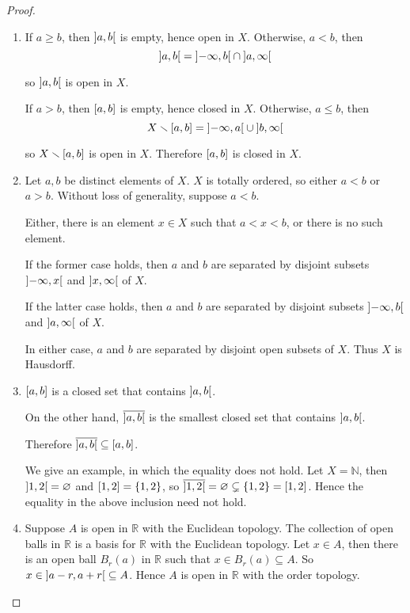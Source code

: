 \begin{proof}
	\begin{enumerate}[label={(\alph*)}]
		\item If $a\geq b$, then $\left]{a,b}\right[$ is empty, hence open in $X$. Otherwise, $a < b$, then
		      \[
			      \left]{a, b}\right[ = \left]{-\infty, b}\right[ \cap \left]{a, \infty}\right[
		      \]

		      so $\left]{a, b}\right[$ is open in $X$.

		      If $a > b$, then $\left[{a,b}\right]$ is empty, hence closed in $X$. Otherwise, $a\leq b$, then
		      \[
			      X\smallsetminus \left[{a, b}\right] = \left]{-\infty, a}\right[\cup\left]{b,\infty}\right[
		      \]

		      so $X\smallsetminus \left[{a,b}\right]$ is open in $X$. Therefore $\left[{a,b}\right]$ is closed in $X$.
		\item Let $a, b$ be distinct elements of $X$. $X$ is totally ordered, so either $a < b$ or $a > b$. Without loss of generality, suppose $a < b$.

		      Either, there is an element $x\in X$ such that $a < x < b$, or there is no such element.

		      If the former case holds, then $a$ and $b$ are separated by disjoint subsets $\left]{-\infty, x}\right[$ and $\left]{x, \infty}\right[$ of $X$.

		      If the latter case holds, then $a$ and $b$ are separated by disjoint subsets $\left]{-\infty, b}\right[$ and $\left]{a, \infty}\right[$ of $X$.

		      In either case, $a$ and $b$ are separated by disjoint open subsets of $X$. Thus $X$ is Hausdorff.
		\item $\left[{a,b}\right]$ is a closed set that contains $\left]{a, b}\right[$.

		      On the other hand, $\overline{\left]{a,b}\right[}$ is the smallest closed set that contains $\left]{a, b}\right[$.

		      Therefore $\overline{\left]{a,b}\right[}\subseteq \left[{a, b}\right]$.

		      We give an example, in which the equality does not hold. Let $X = \mathbb{N}$, then $\left]{1,2}\right[ = \varnothing$ and $\left[{1,2}\right] = \{ 1, 2 \}$, so $\overline{\left]{1,2}\right[} = \varnothing \subsetneq \{ 1, 2 \} = \left[{1,2}\right]$. Hence the equality in the above inclusion need not hold.
		\item Suppose $A$ is open in $\mathbb{R}$ with the Euclidean topology. The collection of open balls in $\mathbb{R}$ is a basis for $\mathbb{R}$ with the Euclidean topology. Let $x\in A$, then there is an open ball $B_{r}(a)$ in $\mathbb{R}$ such that $x\in B_{r}(a)\subseteq A$. So $x\in \left]{a-r,a+r}\right[\subseteq A$. Hence $A$ is open in $\mathbb{R}$ with the order topology.


\end{enumerate}
\end{proof}
